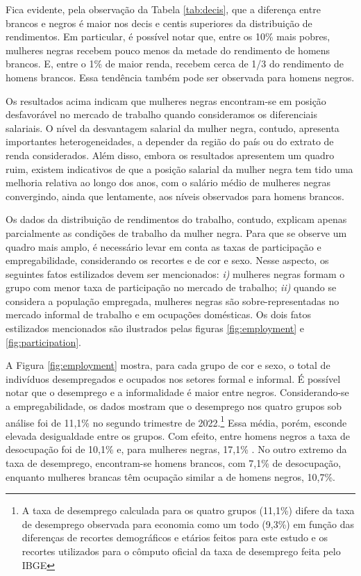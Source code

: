 \documentclass[12pt]{article}
\begin{document}


\par Fica evidente, pela observação da Tabela \ref{tab:decis}, que a diferença entre brancos e negros é maior nos decis e centis superiores da distribuição de rendimentos. Em particular, é possível notar que, entre os 10\% mais pobres, mulheres negras recebem pouco menos da metade do rendimento de homens brancos. E, entre o 1\% de maior renda, recebem cerca de 1/3 do rendimento de homens brancos. Essa tendência também pode ser observada para homens negros.

\par Os resultados acima indicam que mulheres negras encontram-se em posição desfavorável no mercado de trabalho quando consideramos os diferenciais salariais. O nível da desvantagem salarial da mulher negra, contudo, apresenta importantes heterogeneidades, a depender da região do país ou do extrato de renda considerados. Além disso, embora os resultados apresentem um quadro ruim, existem indicativos de que a posição salarial da mulher negra tem tido uma melhoria relativa ao longo dos anos, com o salário médio de mulheres negras convergindo, ainda que lentamente, aos níveis observados para homens brancos. 

\par Os dados da distribuição de rendimentos do trabalho, contudo, explicam apenas parcialmente as condições de trabalho da mulher negra. Para que se observe um quadro mais amplo, é necessário levar em conta as taxas de participação e empregabilidade, considerando os recortes e de cor e sexo. Nesse aspecto, os seguintes fatos estilizados devem ser mencionados: \textit{i)} mulheres negras formam o grupo com menor taxa de participação no mercado de trabalho; \textit{ii)} quando se considera a população empregada, mulheres negras são sobre-representadas no mercado informal de trabalho e em ocupações domésticas. Os dois fatos estilizados mencionados são ilustrados pelas figuras \ref{fig:employment} e \ref{fig:participation}.

\par A Figura \ref{fig:employment} mostra, para cada grupo de cor e sexo, o total de indivíduos desempregados e ocupados nos setores formal e informal. É possível notar que o desemprego e a informalidade é maior entre negros. Considerando-se a empregabilidade, os dados mostram que o desemprego nos quatro grupos sob análise foi de 11,1\% no segundo trimestre de 2022.\footnote{A taxa de desemprego calculada para os quatro grupos (11,1\%) difere da taxa de desemprego observada para economia como um todo (9,3\%) em função das diferenças de recortes demográficos e etários feitos para este estudo e os recortes utilizados para o cômputo oficial da taxa de desemprego feita pelo IBGE} Essa média, porém, esconde elevada desigualdade entre os grupos. Com efeito, entre homens negros a taxa de desocupação foi de 10,1\% e, para mulheres negras, 17,1\% . No outro extremo da taxa de desemprego, encontram-se homens brancos, com 7,1\% de desocupação, enquanto mulheres brancas têm ocupação similar a de homens negros, 10,7\%.
\end{document}
